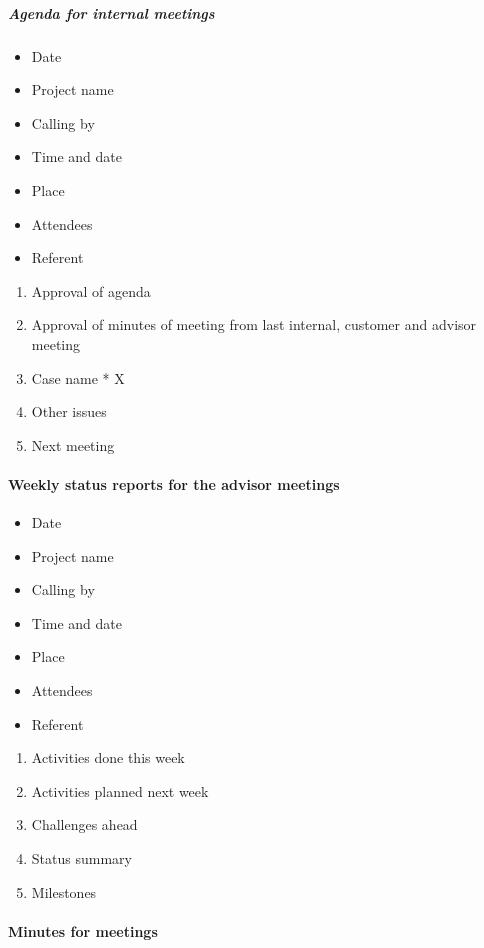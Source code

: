 \subparagraph{Agenda for internal meetings} \hfill
\newline
\begin{itemize}
\item{}Date
\item{}Project name
\item{}Calling by
\item{}Time and date 
\item{}Place 
\item{}Attendees 
\item{}Referent
\end{itemize}

\begin{enumerate}
\item{}Approval of agenda
\item{}Approval of minutes of meeting from last internal, customer and advisor meeting
\item{}Case name * X
\item{}Other issues
\item{}Next meeting
\end{enumerate}

\paragraph{Weekly status reports for the advisor meetings}
\begin{itemize}
\item{}Date
\item{}Project name
\item{}Calling by
\item{}Time and date 
\item{}Place 
\item{}Attendees 
\item{}Referent
\end{itemize}

\begin{enumerate}
\item{}Activities done this week
\item{}Activities planned next week
\item{}Challenges ahead
\item{}Status summary
\item{}Milestones
\end{enumerate}

\paragraph{Minutes for meetings}

